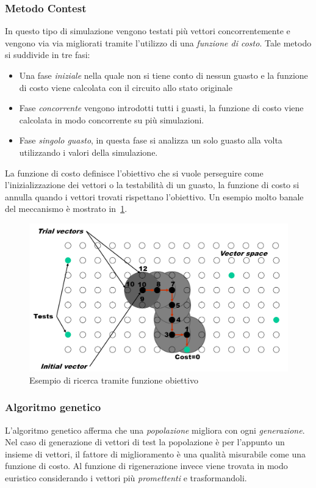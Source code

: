 \subsubsection{Metodo Contest}
In questo tipo di simulazione vengono testati più vettori concorrentemente e vengono via via migliorati tramite l'utilizzo di una \emph{funzione di costo}. Tale metodo si suddivide in tre fasi:
\begin{itemize}
\item Una fase \emph{iniziale} nella quale non si tiene conto di nessun guasto e la funzione di costo viene calcolata con il circuito allo stato originale
\item Fase \emph{concorrente} vengono introdotti tutti i guasti, la funzione di costo viene calcolata in modo concorrente su più simulazioni.
\item Fase \emph{singolo guasto}, in questa fase si analizza un solo guasto alla volta utilizzando i valori della simulazione.
\end{itemize}
La funzione di costo definisce l'obiettivo che si vuole perseguire come l'inizializzazione dei vettori o la testabilità di un guasto, la funzione di costo si annulla quando i vettori trovati rispettano l'obiettivo.
Un esempio molto banale del meccanismo è mostrato in \figurename\,\ref{fig:contest}.\\
\begin{figure}
\centering
\includegraphics[scale=0.4]{img/contest.png}
\caption{Esempio di ricerca tramite funzione obiettivo}\label{fig:contest}
\end{figure}
\subsubsection{Algoritmo genetico}
L'algoritmo genetico afferma che una \emph{popolazione} migliora con ogni \emph{generazione}. 
Nel caso di generazione di vettori di test la popolazione è per l'appunto un insieme di vettori, il fattore di miglioramento è una qualità misurabile come una funzione di costo. Al funzione di rigenerazione invece viene trovata in modo euristico considerando i vettori più \emph{promettenti} e trasformandoli.
